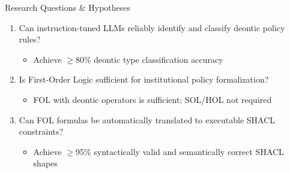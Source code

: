 \documentclass[aspectratio=169, 10pt]{beamer}
\begin{document}
\begin{frame}{Research Questions \& Hypotheses}
    \begin{enumerate}
        \item[\textbf{RQ1}] Can instruction-tuned LLMs reliably identify and classify deontic policy rules?
        \begin{itemize}
            \item[\textbf{H1}] Achieve $\geq$80\% deontic type classification accuracy
        \end{itemize}
        
        \vspace{0.3cm}
        \item[\textbf{RQ2}] Is First-Order Logic sufficient for institutional policy formalization?
        \begin{itemize}
            \item[\textbf{H2}] FOL with deontic operators is sufficient; SOL/HOL not required
        \end{itemize}
        
        \vspace{0.3cm}
        \item[\textbf{RQ3}] Can FOL formulas be automatically translated to executable SHACL constraints?
        \begin{itemize}
            \item[\textbf{H3}] Achieve $\geq$95\% syntactically valid and semantically correct SHACL shapes
        \end{itemize}
    \end{enumerate}
\end{frame}
\end{document}
